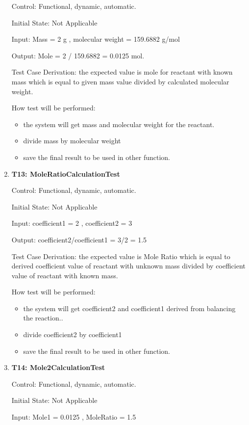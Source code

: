 \documentclass[12pt, titlepage]{article}
\begin{document}
\begin{enumerate}
Control: Functional, dynamic, automatic.
					
Initial State: Not Applicable
					
Input: Mass = 2 g , molecular weight = 159.6882 g/mol
			
Output:  Mole = 2 / 159.6882 =  0.0125 mol. 

Test Case Derivation: the expected value is mole for reactant with known mass which is equal to given mass value divided by calculated molecular weight. 	
				
How test will be performed: 
\begin{itemize}
\item the system will get mass and molecular weight  for the reactant.
\item divide mass by molecular weight 
\item save the final result to be used in other function.
\end{itemize}

\item{\bf T13: MoleRatioCalculationTest \\}

Control: Functional, dynamic, automatic.
					
Initial State: Not Applicable
					
Input: coefficient1 = 2  , coefficient2 = 3
			
Output:  coefficient2/coefficient1 = 3/2 = 1.5 

Test Case Derivation: the expected value is Mole Ratio which is equal to derived coefficient value of reactant with unknown mass divided by coefficient value of reactant with known mass.
 					
How test will be performed: 
\begin{itemize}
\item the system will get coefficient2 and coefficient1 derived from balancing the reaction..
\item divide coefficient2 by coefficient1  
\item save the final result to be used in other function.
\end{itemize}

\item{\bf T14: Mole2CalculationTest\\}

Control: Functional, dynamic, automatic.
					
Initial State: Not Applicable
					
Input: Mole1 = 0.0125  , MoleRatio = 1.5
			

\end{enumerate}
\end{document}
